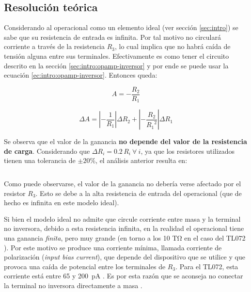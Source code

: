 \subsection{Resolución teórica}

Considerando al operacional como un elemento ideal (ver sección \ref{sec:intro})
se sabe que su resistencia de entrada es infinita. Por tal motivo no circulará
corriente a través de la resistencia $R_3$, lo cual implica que no habrá caída
de tensión alguna entre sus terminales. Efectivamente es como tener el circuito
descrito en la sección \ref{sec:intro:opamp-inversor} y por ende se puede usar
la ecuación \ref{ec:intro:opamp-inversor}. Entonces queda:

\begin{equation}
    \label{ec:1-teoria:ganancia}
    A = -\frac{R_2}{R_1}
\end{equation}

\begin{equation}
    \label{ec:1-teoria:err-ganancia}
    \Delta A = \left| - \frac{1}{R_1} \right| \Delta R_2
             + \left| - \frac{R_2}{{R_1}^2} \right| \Delta R_1
\end{equation}

Se observa que el valor de la ganancia \textbf{no depende del valor de la
resistencia de carga}. Considerando que $\Delta R_i = 0.2\,R_i\ \forall\ i$, ya
que los resistores utilizados tienen una tolerancia de $\pm 20\%$, el análisis
anterior resulta en:

\[
    
\]

Como puede observarse, el valor de la ganancia no debería verse afectado por el
resistor $R_3$. Esto se debe a la alta resistencia de entrada del operacional
(que de hecho es infinita en este modelo ideal).

Si bien el modelo ideal no admite que circule corriente entre masa y la
terminal no inversora, debido a esta resistencia infinita, en la realidad
el operacional tiene una ganancia \textit{finita}, pero muy grande (en torno a
los 10 \si{\tera\ohm} en el caso del TL072 \cite[pág. 5]{datasheet-tl072}).
Por este motivo se produce una corriente mínima, llamada corriente de
polarización (\textit{input bias current}), que depende del dispositivo que se
utilice y que provoca una caída de potencial entre los terminales de $R_3$.
Para el TL072, esta corriente está entre 65 y \SI{200}{\pico\ampere} 
\cite[pág. 5]{datasheet-tl072}. Es por esta razón que se aconseja no
conectar la terminal no inversora directamente a masa \cite[pág. 252]{AOE}.
